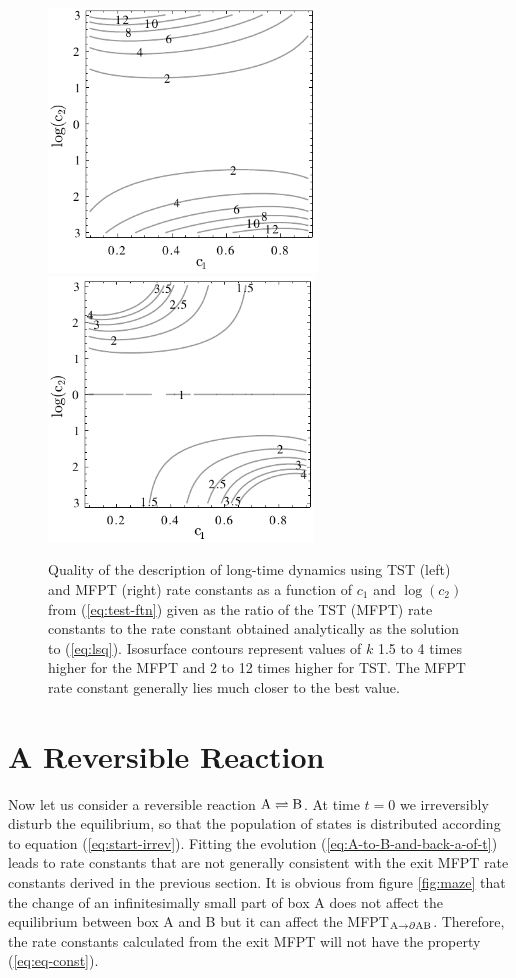 \begin{figure}[h]
\centering
\includegraphics[height=7cm]{Images/derivk.pdf}
\includegraphics[height=7cm]{Images/intk.pdf}
\caption[Performance of TST and MFPT rate constants.]{Quality of the description of long-time dynamics using TST (left) and MFPT (right) rate constants as a function of $c_1$ and $\log(c_2)$ from (\ref{eq:test-ftn}) given as the ratio of the TST (MFPT) rate constants to the rate constant obtained analytically as the solution to (\ref{eq:lsq}). Isosurface contours represent values of $k$ 1.5 to 4 times higher for the MFPT and 2 to 12 times higher for TST. The MFPT rate constant generally lies much closer to the best value.}
\label{fig:diagram-k}
\end{figure}


\section{A Reversible Reaction}

Now let us consider a reversible reaction $\rm A \rightleftharpoons B$.
At time $t=0$ we irreversibly disturb the equilibrium, so that the population of states is distributed according to equation (\ref{eq:start-irrev}).
Fitting the evolution (\ref{eq:A-to-B-and-back-a-of-t}) leads to rate constants that are not generally consistent with the exit MFPT rate constants derived in the previous section.
It is obvious from figure \ref{fig:maze} that the change of an infinitesimally small part of box A does not affect the equilibrium between box A and B but it can affect the MFPT$_{\rm A \rightarrow \partial AB}$.
Therefore, the rate constants calculated from the exit MFPT will not have the property (\ref{eq:eq-const}).

